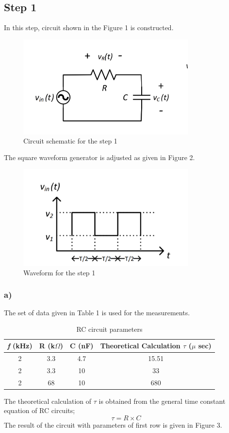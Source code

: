 \documentclass[letterpaper,12pt]{article}
\begin{document}
\subsection{Step 1}
In this step, circuit shown in the Figure 1  is constructed. 
\begin{figure}[H]
	\centering
   \includegraphics[width=0.8\textwidth]{1_sch.png}
   \caption{Circuit schematic for the step 1}
\end{figure} 
The square waveform generator is adjusted as given in Figure 2.
\begin{figure}[H]
	\centering
   \includegraphics[width=0.8\textwidth]{1_signal.png}
   \caption{Waveform for the step 1}
\end{figure} 


\subsubsection{a)}
The set of data given in Table 1 is used for the measurements.

\begin{table}[H]
\begin{center}
\caption{RC circuit parameters}
\vspace{2mm}
	\begin{tabular}{||c | c | c | c||} 
	 \hline
	 \emph{f} (kHz) & R (k\(\Omega\)) & C (nF) & Theoretical Calculation \(\tau\) (\(\mu\) sec) \\ [0.5ex] 
	 \hline\hline
	 2 & 3.3 & 4.7 & 15.51 \\ 
	 \hline
	 2 & 3.3 & 10 & 33 \\ 
	 \hline
	 2& 68 & 10  & 680  \\
	 \hline
\end{tabular}
\end{center}
\end{table}
The theoretical calculation of \(\tau\) is obtained from the general time constant equation of RC circuits;
\[\tau = R \times C\]
The result of the circuit with parameters of first row is given in Figure 3.
\end{document}
